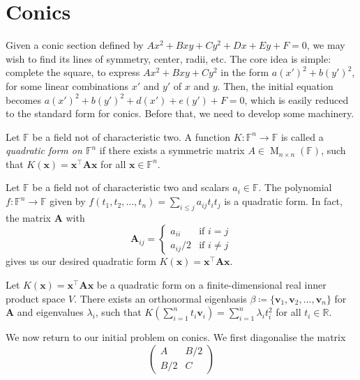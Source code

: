 \documentclass[../Notes.tex]{subfiles}
\begin{document}
\section{Conics}
Given a conic section defined by \(Ax^2+Bxy+Cy^2+Dx+Ey+F=0\), we may wish to find its lines of symmetry, center, radii, etc. The core idea is simple: complete the square, to express \(Ax^2+Bxy+Cy^2\) in the form \(a(x')^2+b(y')^2\), for some linear combinations \(x'\) and \(y'\) of \(x\) and \(y\). Then, the initial equation becomes \(a(x')^2+b(y')^2+d(x')+e(y')+F=0\), which is easily reduced to the standard form for conics. Before that, we need to develop some machinery.
\begin{definition}{}{}
    Let \(\mathbb{F}\) be a field not of characteristic two. A function \(K\colon \mathbb{F}^n\to \mathbb{F}\) is called a \emph{quadratic form on \(\mathbb{F}^n\)} if there exists a symmetric matrix \(A\in \operatorname{M}_{n \times n}(\mathbb{F})\), such that \(K(\mathbf{x})=\mathbf{x}^{\top} \mathbf{A}\mathbf{x}\) for all \(\mathbf{x}\in \mathbb{F}^n\).
\end{definition}
\begin{note}
    Let \(\mathbb{F}\) be a field not of characteristic two and scalars \(a_i\in \mathbb{F}\). The polynomial \(f\colon \mathbb{F}^n\to \mathbb{F}\) given by \(f(t_1,t_2,\dots,t_n)=\sum_{i\leq j}{a_{ij}t_it_j}\) is a quadratic form. In fact, the matrix \(\mathbf{A}\) with 
    \[\mathbf{A}_{ij}=
    \begin{cases}
        a_{ii} &\text{if }i=j\\
        a_{ij}/2 &\text{if }i\neq j
    \end{cases}\]
    gives us our desired quadratic form \(K(\mathbf{x})=\mathbf{x}^{\top}\mathbf{A}\mathbf{x}\).
\end{note}
\begin{theorem}{}{}
    \hypertarget{thm:quadratic-forms-real}{}
    Let \(K(\mathbf{x})=\mathbf{x}^{\top} \mathbf{A}\mathbf{x}\) be a quadratic form on a finite-dimensional real inner product space \(V\). There exists an orthonormal eigenbasis \(\beta\coloneq\{\mathbf{v}_1,\mathbf{v}_2,\dots,\mathbf{v}_n\}\) for \(\mathbf{A}\) and eigenvalues \(\lambda_i\), such that \(K\left( \sum_{i=1}^{n}{t_i \mathbf{v}_i} \right)=\sum_{i=1}^{n}{\lambda_it_i^2}\) for all \(t_i\in \mathbb{R}\).
\end{theorem}
We now return to our initial problem on conics. We first diagonalise the matrix 
\[\begin{pmatrix}
    A & B/2\\
    B/2 & C
\end{pmatrix}\]
\end{document}
